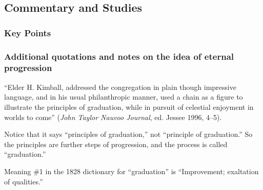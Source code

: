 	
\subsection{Commentary and Studies} %
	\label{PROGRESSION-COMMENTARY}

	\subsubsection{Key Points}
		\label{PROGRESSION-KEYS}
	
		\begin{compactitem}
			\item
		\end{compactitem}
		
	\subsubsection{Additional quotations and notes on the idea of eternal progression}
		\label{PROGRESSION-notes}
		
		\begin{compactdesc}
			\item[Heber Kimball, 26 December 1844] ``Elder H. Kimball, addressed the congregation in plain though impressive language, and in his usual philanthropic manner, used a chain as a figure to illustrate the principles of graduation, while in pursuit of celestial enjoyment in worlds to come'' (\textit{John Taylor Nauvoo Journal}, ed. Jessee 1996, 4--5).
				\begin{compactitem}
					\item Notice that it says ``principles of graduation,'' not ``principle of graduation.'' So the principles are further steps of progression, and the process is called ``graduation.''
					\item Meaning \#1 in the 1828 dictionary for ``graduation'' is ``Improvement; exaltation of qualities.''
				\end{compactitem} 
		\end{compactdesc}